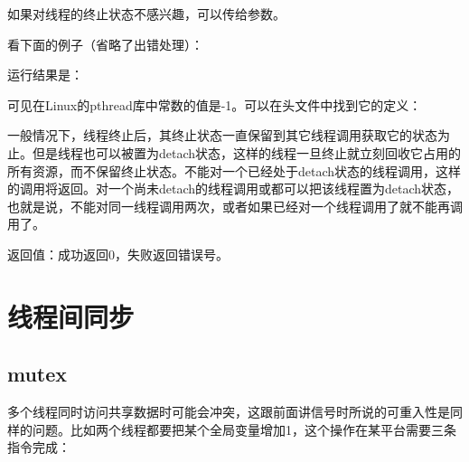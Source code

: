 如果对线程的终止状态不感兴趣，可以传给参数。



看下面的例子（省略了出错处理）：




运行结果是：




可见在Linux的pthread库中常数的值是-1。可以在头文件中找到它的定义：




一般情况下，线程终止后，其终止状态一直保留到其它线程调用获取它的状态为止。但是线程也可以被置为detach状态，这样的线程一旦终止就立刻回收它占用的所有资源，而不保留终止状态。不能对一个已经处于detach状态的线程调用，这样的调用将返回。对一个尚未detach的线程调用或都可以把该线程置为detach状态，也就是说，不能对同一线程调用两次，或者如果已经对一个线程调用了就不能再调用了。




返回值：成功返回0，失败返回错误号。




\section{线程间同步}
%
\subsection{mutex}
%


多个线程同时访问共享数据时可能会冲突，这跟前面讲信号时所说的可重入性是同样的问题。比如两个线程都要把某个全局变量增加1，这个操作在某平台需要三条指令完成：


